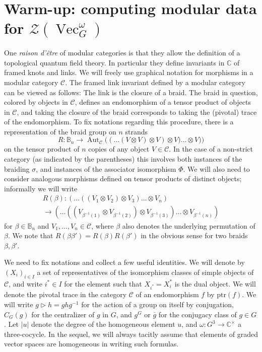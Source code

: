 \documentclass[11pt]{book}
\theoremstyle{Rem}
\theoremstyle{definition}
\numberwithin{equation}{section}
\newcommand\ol[1]{\overline{#1}}
\newcommand\ptr{\text{ptr}}
\newcommand\hit{\triangleright}
\newcommand\inv{^{-1}}
\newcommand\ot{\otimes}
\newcommand\Vect{\operatorname{Vec}}
\newcommand\CC{\mathbb C}
\newcommand\CCu{\CC^\times}
\newcommand\C{\mathcal C}
\newcommand\CTR{\mathcal Z}
\begin{document}
\section{Warm-up: computing modular data for $\CTR(\Vect^\omega_G)$}
One \emph{raison d'être} of modular categories is that they allow the definition of a topological quantum field theory. In particular they define invariants in $\CC$ of framed knots and links. We will freely use graphical notation for morphisms in a modular category $\C$. The framed link invariant defined by a modular category can be viewed as follows: The link is the closure of a braid. The braid in question, colored by objects in $\C$,  defines an endomorphism of a tensor product of objects in $\C$, and taking the closure of the braid corresponds to taking the (pivotal) trace of the endomorphism. To fix notations regarding this procedure, there is a representation of the braid group on $n$ strands
$$R\colon\mathbb B_n\to\operatorname{Aut}_{\C}\bigl( (\dots(V\ot V)\ot V)\ot V)\dots \ot V)\bigr)$$
on the tensor product of $n$ copies of any object $V\in\C$. In the case of a non-strict category (as indicated by the parentheses) this involves both instances of the braiding $\sigma$, and instances of the associator isomorphism $\Phi$. We will also need to consider analogous morphisms defined on tensor products of distinct objects; informally we will write
\begin{multline*}
  R(\beta)\colon (\dots((V_1\ot V_2)\ot V_3)\dots\ot V_n)\\\rightarrow (\dots((V_{\beta\inv(1)}\ot V_{\beta\inv(2)})\ot V_{\beta\inv(3)})\dots\ot V_{\beta\inv(n)}) 
\end{multline*}
for $\beta\in\mathbb B_n$ and $V_1,\dots,V_n\in\C$, where $\beta$ also denotes the underlying permutation of $\beta$. We note that  $R(\beta\beta')=R(\beta)R(\beta')$ in the obvious sense for two braids $\beta,\beta'$.

 We need to fix notations and collect a few useful identities. We will denote by $(X_i)_{i\in I}$ a set of representatives of the isomorphism classes of simple objects of $\C$, and write $i^*\in I$ for the element such that $X_{i^*}=X_i^*$ is the dual object. We will denote the pivotal trace in the category $\C$ of an endomorphism $f$ by $\ptr(f)$. We will write $g\hit h=ghg\inv$ for the action of a group on itself by conjugation, $C_G(g)$ for the centralizer of $g$ in $G$, and $g^G$ or $\ol g$ for the conjugacy class of $g\in G$. 
Let $|u|$ denote the degree of the homogeneous element $u$, and $\omega\colon G^3\rightarrow\CCu$ a three-cocycle. In the sequel, we will always tacitly assume that elements of graded vector spaces are homogeneous in writing such formulas.
\end{document}
